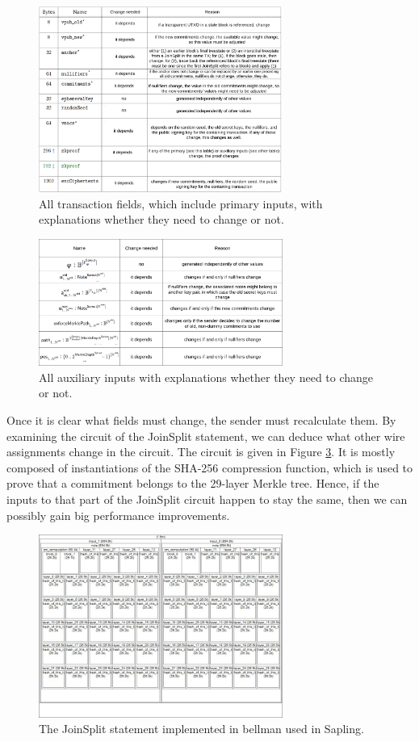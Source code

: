\documentclass{article}
\begin{document}
\begin{figure}[t]
\includegraphics[width=8cm]{images/transactionchange.png}
\caption{All transaction fields, which include primary inputs, with explanations whether they need to change or not.} \label{fig:joinsplit-change}
\centering
\end{figure}

\begin{figure}[t]
\includegraphics[width=8cm]{images/proofchange.png}
\caption{All auxiliary inputs with explanations whether they need to change or not.} \label{fig:proof-change}
\centering
\end{figure}

Once it is clear what fields must change, the sender must recalculate them.
By examining the circuit of the JoinSplit statement, we can deduce what other wire assignments change in the circuit.
The circuit is given in Figure \ref{fig:joinsplit-circuit}.
It is mostly composed of instantiations of the SHA-256 compression function, which is used to prove that a commitment belongs to the 29-layer Merkle tree.
Hence, if the inputs to that part of the JoinSplit circuit happen to stay the same, then we can possibly gain big performance improvements.

\begin{figure}[t]
\includegraphics[width=8cm]{images/joinsplit-groth16-circuit.jpeg}
\caption{The JoinSplit statement implemented in bellman used in Sapling.} \label{fig:joinsplit-circuit}
\centering
\end{figure}
\end{document}
